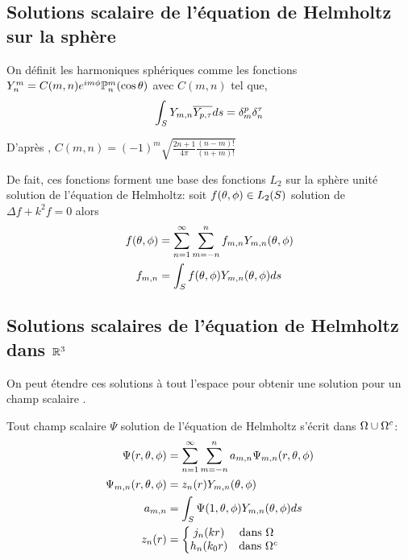 \subsection{Solutions scalaire de l'équation de Helmholtz sur la sphère}

On définit les harmoniques sphériques comme les fonctions \(Y_n^m = C(m,n) e^{im\phi}\mathbb{P}^m_n(\cos \theta) \) avec \(C(m,n)\) tel que,
\[
 \displaystyle\int_S Y_{m,n} {\overline{Y_{p,\tau}}} ds = \delta_m^p \delta_n^\tau
\]

D’après \cite[p.~24]{nedelec_acoustic_2001}, \( C(m,n) = (-1)^m\sqrt{\frac{2n+1}{4\pi}\frac{(n-m)!}{(n+m)!}}\)

De fait, ces fonctions forment une base des fonctions \(L_2\) sur la sphère unité solution de l'équation de Helmholtz: soit \(f(\theta,\phi) \in L_2(S)\) solution de \( \Delta f + k^2 f = 0 \) alors
  \begin{align}
    f(\theta,\phi) &= \sum\limits_{n=1}^\infty\sum\limits_{m=-n}^n f_{m,n} Y_{m,n} (\theta,\phi)\\
    \notag f_{m,n} &= \int_S f(\theta,\phi) Y_{m,n}(\theta,\phi) ds
  \end{align}


\subsection{Solutions scalaires de l'équation de Helmholtz dans \(\mathbb R^3\)}
On peut étendre ces solutions à tout l'espace pour obtenir une solution pour un champ scalaire .

Tout champ scalaire \(\Psi\) solution de l'équation de Helmholtz s'écrit dans \(\Omega\cup\Omega^c\):
\begin{align} 
\label{eq:helm:sol_helmoltz_scal_somme}
\Psi(r,\theta,\phi) &= \sum\limits_{n=1}^\infty\sum\limits_{m=-n}^n a_{m,n} \Psi_{m,n}(r,\theta,\phi) \\
\Psi_{m,n}(r,\theta,\phi) &= z_n(r) Y_{m,n}(\theta,\phi) \\
\notag a_{m,n} &= \int_S \Psi(1,\theta,\phi) Y_{m,n}(\theta,\phi) ds \\
z_n(r) &= \left\lbrace
  \begin{matrix}
  j_n(kr) &   \text{dans \(\Omega~\)} \\
  h_n(k_0r) & \text{dans \(\Omega^c\)} \\
  \end{matrix}\right.
\end{align}

